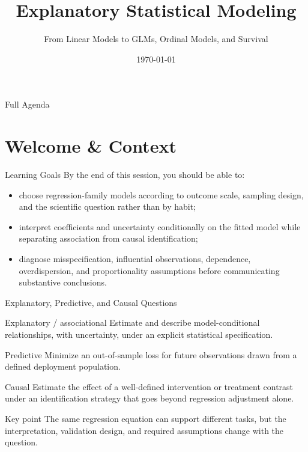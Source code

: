 \documentclass[aspectratio=169]{beamer}
\title[Explanatory Statistical Modeling]{Explanatory Statistical Modeling}
\subtitle{From Linear Models to GLMs, Ordinal Models, and Survival}
\date{\today}
\begin{document}
\begin{frame}
  \titlepage
\end{frame}

\begin{frame}{Full Agenda}
  \tableofcontents
\end{frame}

\section{Welcome \& Context}

\begin{frame}{Learning Goals}
  By the end of this session, you should be able to:
  \begin{itemize}
    \item choose regression-family models according to outcome scale, sampling design, and the scientific question rather than by habit;
    \item interpret coefficients and uncertainty conditionally on the fitted model while separating association from causal identification;
    \item diagnose misspecification, influential observations, dependence, overdispersion, and proportionality assumptions before communicating substantive conclusions.
  \end{itemize}
\end{frame}

\begin{frame}{Explanatory, Predictive, and Causal Questions}
  \begin{block}{Explanatory / associational}
    Estimate and describe model-conditional relationships, with uncertainty, under an explicit statistical specification.
  \end{block}
  \begin{block}{Predictive}
    Minimize an out-of-sample loss for future observations drawn from a defined deployment population.
  \end{block}
  \begin{block}{Causal}
    Estimate the effect of a well-defined intervention or treatment contrast under an identification strategy that goes beyond regression adjustment alone.
  \end{block}
  \begin{alertblock}{Key point}
    The same regression equation can support different tasks, but the interpretation, validation design, and required assumptions change with the question.
  \end{alertblock}
\end{frame}
\end{document}
